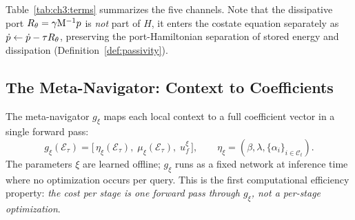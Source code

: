 \begin{table}[htbp]
\centering
\caption{%
  \textbf{Energy terms, their force channels, coefficients, and
  what each shapes in the dynamics.}
  Each row is one link in the enrichment chain
  $H_i \to F_i \to \vartheta_i$.
}
\label{tab:ch3:terms}
\small
\setlength{\tabcolsep}{5pt}
\renewcommand{\arraystretch}{1.3}
\end{table}

Table~\ref{tab:ch3:terms} summarizes the five channels.
Note that the dissipative port $R_\theta = \gamma\mathrm{M}^{-1}p$
is \emph{not} part of $H$, it enters the costate equation
separately as $\dot{p} \leftarrow \dot{p} - \tau R_\theta$,
preserving the port-Hamiltonian separation of stored energy and
dissipation (Definition~\ref{def:passivity}).

\subsection{The Meta-Navigator: Context to Coefficients}
\label{subsec:ch3:metanav}

The meta-navigator $g_\xi$ maps each local context to a full
coefficient vector in a single forward pass:
\begin{equation}
  g_\xi(\mathcal{E}_\tau)
  = \bigl[\,\eta_\xi(\mathcal{E}_\tau),\;\mu_\xi(\mathcal{E}_\tau),\;u_f^\xi\,\bigr],
  \qquad
  \eta_\xi = (\beta, \lambda, \{\alpha_i\}_{i\in\mathcal{C}_t}).
  \label{eq:ch3:metanav}
\end{equation}
The parameters $\xi$ are learned offline; $g_\xi$ runs as a
fixed network at inference time where no optimization occurs per query.
This is the first computational efficiency property: \emph{the cost
per stage is one forward pass through $g_\xi$, not a per-stage
optimization}.


